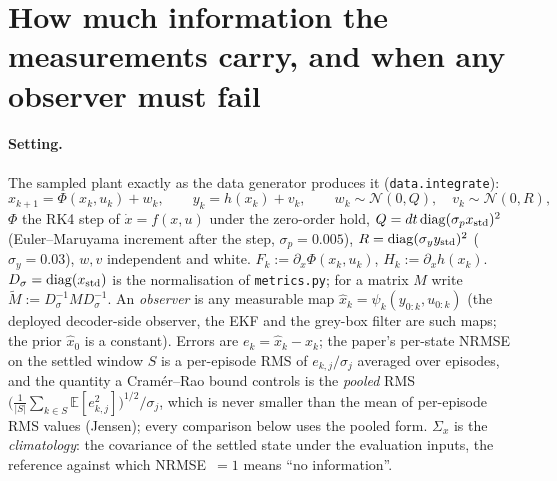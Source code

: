 \section{How much information the measurements carry, and when any observer must fail}\label{sec:m4}

\paragraph{Setting.} The sampled plant exactly as the data generator produces it (\texttt{data.integrate}):
\begin{equation}\label{eq:m4-plant}
x_{k+1}=\Phi(x_k,u_k)+w_k,\qquad y_k=h(x_k)+v_k,\qquad w_k\sim\mathcal N(0,Q),\quad v_k\sim\mathcal N(0,R),
\end{equation}
$\Phi$ the RK4 step of $\dot x=f(x,u)$ under the zero-order hold, $Q=dt\,\mathrm{diag}(\sigma_p x_{\rm std})^2$
(Euler--Maruyama increment after the step, $\sigma_p=0.005$), $R=\mathrm{diag}(\sigma_yy_{\rm std})^2$
($\sigma_y=0.03$), $w,v$ independent and white. $F_k:=\partial_x\Phi(x_k,u_k)$, $H_k:=\partial_xh(x_k)$.
$D_\sigma=\mathrm{diag}(x_{\rm std})$ is the normalisation of \texttt{metrics.py}; for a matrix $M$ write
$\tilde M:=D_\sigma^{-1}MD_\sigma^{-1}$. An \emph{observer} is any measurable map
$\hat x_k=\psi_k(y_{0:k},u_{0:k})$ (the deployed decoder-side observer, the EKF and the grey-box filter are
such maps; the prior $\hat x_0$ is a constant). Errors are $e_k=\hat x_k-x_k$; the paper's per-state NRMSE on the
settled window $S$ is a per-episode RMS of $e_{k,j}/\sigma_j$ averaged over episodes, and the quantity a Cram\'er--Rao
bound controls is the \emph{pooled} RMS $\big(\tfrac1{|S|}\sum_{k\in S}\mathbb E[e_{k,j}^2]\big)^{1/2}/\sigma_j$, which
is never smaller than the mean of per-episode RMS values (Jensen); every comparison below uses the pooled form.
$\Sigma_x$ is the \emph{climatology}: the covariance of the settled state under the evaluation inputs, the
reference against which NRMSE~$=1$ means ``no information''.

